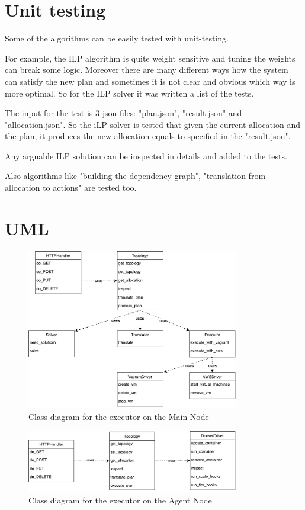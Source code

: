 \section{Unit testing}
Some of the algorithms can be easily tested with unit-testing.

For example, the ILP algorithm is quite weight sensitive and tuning the weights can break some logic. Moreover there are many different ways how the system can satisfy the new plan and sometimes it is not clear and obvious which way is more optimal. So for the ILP solver it was written a list of the tests.

The input for the test is 3 json files: "plan.json", "result.json" and "allocation.json". So the iLP solver is tested that given the current allocation and the plan, it produces the new allocation equals to specified in the "result.json".

Any arguable ILP solution can be inspected in details and added to the tests.

Also algorithms like "building the dependency graph", "translation from allocation to actions" are tested too.

\section{UML}
\begin{figure}[ht]
  \centering
    \includegraphics[width=350px,natwidth=633,natheight=482]{./pictures/implementation-main}
    \caption{Class diagram for the executor on the Main Node}
\end{figure}

\begin{figure}[ht]
  \centering
    \includegraphics[width=350px,natwidth=643,natheight=190]{./pictures/implementation-agent}
    \caption{Class diagram for the executor on the Agent Node}
\end{figure}

